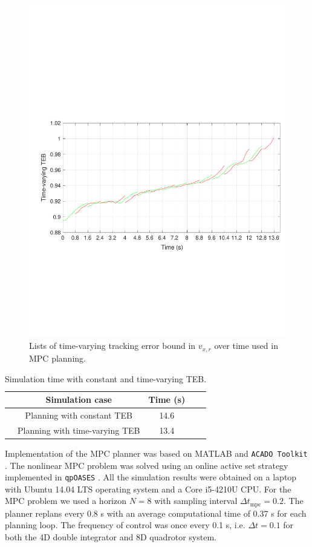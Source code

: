 \begin{figure}
  \includegraphics[width=\columnwidth]{fig/Q8D_Q4D/TVTEB}
  \caption{Lists of time-varying tracking error bound in $v_{x,r}$ over time used in MPC planning.}
  \label{fig:Q8D_TVTEB}
\end{figure}

\begin{table}[htbp!]
\caption{\small{Simulation time with constant and time-varying TEB.}}
\centering
\normalsize
\begin{tabular}{ccccc}
\hline
&Simulation case &  Time (s)    \\ 
\hline
&Planning with constant TEB     &  14.6  \\
&Planning with time-varying TEB &  13.4  \\
\hline
\end{tabular}
\label{tab:sim_time}
\end{table}

Implementation of the MPC planner was based on MATLAB and \texttt{ACADO Toolkit} \cite{Houska2011a}. The nonlinear MPC problem was solved using an online active set strategy implemented in \texttt{qpOASES} \cite{Ferreau2014}. All the simulation results were obtained on a laptop with Ubuntu 14.04 LTS operating system and a Core i5-4210U CPU. For the MPC problem we used a horizon $N=8$ with sampling interval $\Delta t_{\text{mpc}} = 0.2$. The planner replans every 0.8 s with an average computational time of 0.37 s for each planning loop. The frequency of control was once every 0.1 s, i.e. $\Delta t = 0.1$ for both the 4D double integrator and 8D quadrotor system.